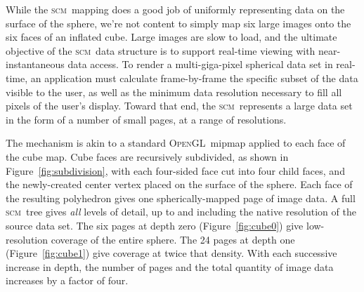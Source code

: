 \documentclass[oneside,11pt]{memoir}
\newcommand{\opengl}  {\textsc{OpenGL}}
\newcommand{\scm}     {\textsc{scm}}
\begin{document}
\begin{Spacing}{1.1}
While the \scm\ mapping does a good job of uniformly representing data on the surface of the sphere, we're not content to simply map six large images onto the six faces of an inflated cube. Large images are slow to load, and the ultimate objective of the \scm\ data structure is to support real-time viewing with near-instantaneous data access. To render a multi-giga-pixel spherical data set in real-time, an application must calculate frame-by-frame the specific subset of the data visible to the user, as well as the minimum data resolution necessary to fill all pixels of the user's display. Toward that end, the \scm\ represents a large data set in the form of a number of small pages, at a range of resolutions.

The mechanism is akin to a standard \opengl\ mipmap applied to each face of the cube map. Cube faces are recursively subdivided, as shown in Figure~\ref{fig:subdivision}, with each four-sided face cut into four child faces, and the newly-created center vertex placed on the surface of the sphere. Each face of the resulting polyhedron gives one spherically-mapped page of image data. A full \scm\ tree gives \emph{all} levels of detail, up to and including the native resolution of the source data set. The six pages at depth zero (Figure~\ref{fig:cube0}) give low-resolution coverage of the entire sphere. The 24 pages at depth one (Figure~\ref{fig:cube1}) give coverage at twice that density. With each successive increase in depth, the number of pages and the total quantity of image data increases by a factor of four.


\end{Spacing}
\end{document}
